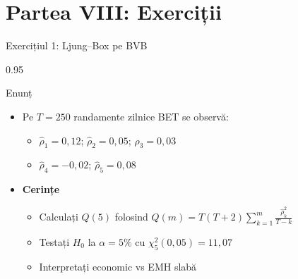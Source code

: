 \documentclass[9pt, aspectratio=169, t]{beamer}
\begin{document}
\section{Partea VIII: Exerciții}

\begin{frame}[shrink=15]{Exercițiul 1: Ljung--Box pe BVB}
\begin{cminipage}{0.95\textwidth}
\begin{block}{Enunț}
\begin{itemize}\setlength{\itemsep}{0pt}
    \item Pe $T = 250$ randamente zilnice BET se observă:
    \begin{itemize}\setlength{\itemsep}{0pt}
        \item $\hat\rho_1 = 0{,}12$; $\hat\rho_2 = 0{,}05$; $\hat\rho_3 = 0{,}03$
        \item $\hat\rho_4 = -0{,}02$; $\hat\rho_5 = 0{,}08$
    \end{itemize}
\end{itemize}
\end{block}

\begin{itemize}\setlength{\itemsep}{0pt}
    \item \textbf{Cerințe}
    \begin{itemize}\setlength{\itemsep}{0pt}
        \item Calculați $Q(5)$ folosind $Q(m) = T(T+2)\sum_{k=1}^{m}\frac{\hat\rho_k^2}{T-k}$
        \item Testați $H_0$ la $\alpha = 5\%$ cu $\chi^2_5(0{,}05) = 11{,}07$
        \item Interpretați economic vs EMH slabă
    \end{itemize}
\end{itemize}
\end{cminipage}
\end{frame}
\end{document}
